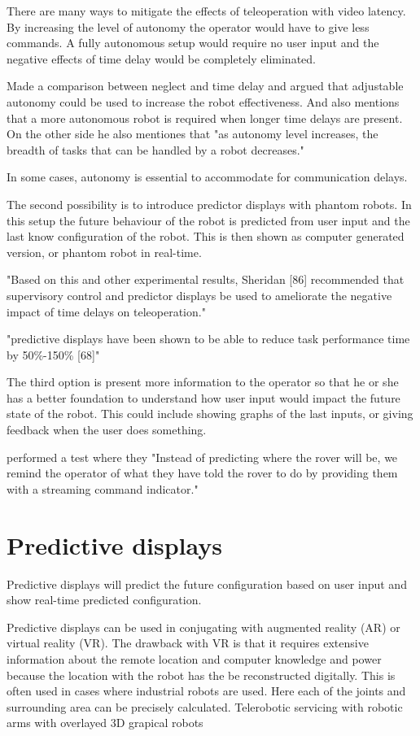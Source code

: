 There are many ways to mitigate the effects of teleoperation with video latency. By increasing the level of autonomy the operator would have to give less commands. A fully autonomous setup would require no user input and the negative effects of time delay would be completely eliminated.

\citep{Goodrich2001} Made a comparison between neglect and time delay and argued that adjustable autonomy could be used to increase the robot effectiveness. And also mentions that a more autonomous robot is required when longer time delays are present. On the other side he also mentiones that "as autonomy level increases, the breadth of tasks that can be handled by a robot decreases."

In some cases, autonomy is essential to accommodate for communication delays. \citep{Dorais1999}

The second possibility is to introduce predictor displays with phantom robots. In this setup the future behaviour of the robot is predicted from user input and the last know configuration of the robot. This is then shown as computer generated version, or phantom robot in real-time.

\citep{Chen2007} "Based on this and other experimental results, Sheridan [86] recommended that supervisory control and predictor displays be used to ameliorate the negative impact of time delays on teleoperation."

"predictive displays have been shown to be able to reduce task performance time by 50\%-150\% [68]"

The third option is present more information to the operator so that he or she has a better foundation to understand how user input would impact the future state of the robot. This could include showing graphs of the last inputs, or giving feedback when the user does something.

\citep{Miller2005} performed a test where they "Instead of predicting where the rover will be, we remind the operator of what they have told the rover to do by providing them with a streaming command indicator."


\section{Predictive displays}

Predictive displays will predict the future configuration based on user input and show real-time predicted configuration.

Predictive displays can be used in conjugating with augmented reality (AR) or virtual reality (VR). The drawback with VR is that it requires extensive information about the remote location and computer knowledge and power because the location with the robot has the be reconstructed digitally. This is often used in cases where industrial robots are used. Here each of the joints and surrounding area can be precisely calculated. Telerobotic servicing with robotic arms with overlayed 3D grapical robots \citep{Kim1993}

